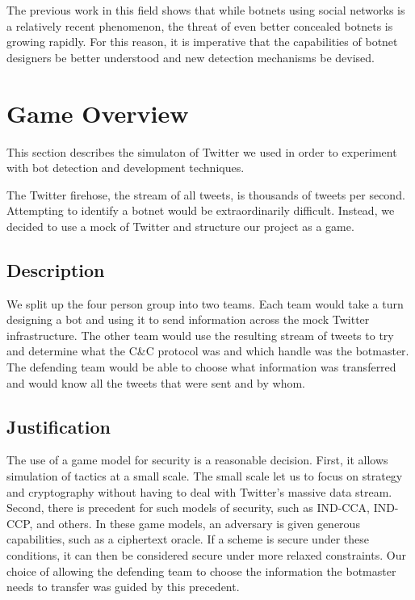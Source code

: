 \documentclass[11pt, oneside]{article} %
\numberwithin{equation}{section} %
\numberwithin{figure}{section} %
\numberwithin{table}{section} %
\begin{document}
The previous work in this field shows that while botnets using social networks is a relatively recent phenomenon, the threat of even better concealed botnets is growing rapidly. For this reason, it is imperative that the capabilities of botnet designers be better understood and new detection mechanisms be devised.

\section{Game Overview}
	This section describes the simulaton of Twitter we used in order to experiment with bot detection and development techniques.

The Twitter firehose, the stream of all tweets, is thousands of tweets per second. Attempting to identify a botnet would be extraordinarily difficult. Instead, we decided to use a mock of Twitter and structure our project as a game.
	
	\subsection{Description}
		We split up the four person group into two teams. Each team would take a turn designing a bot and using it to send information across the mock Twitter infrastructure. The other team would use the resulting stream of tweets to try and determine what the C\&C protocol was and which handle was the botmaster. The defending team would be able to choose what information was transferred and would know all the tweets that were sent and by whom.

	\subsection{Justification}
		The use of a game model for security is a reasonable decision. First, it allows simulation of tactics at a small scale. The small scale let us to focus on strategy and cryptography without having to deal with Twitter's massive data stream. Second, there is precedent for such models of security, such as \textsf{IND-CCA}, \textsf{IND-CCP}, and others. In these game models, an adversary is given generous capabilities, such as a ciphertext oracle. If a scheme is secure under these conditions, it can then be considered secure under more relaxed constraints. Our choice of allowing the defending team to choose the information the botmaster needs to transfer was guided by this precedent.
\end{document}
